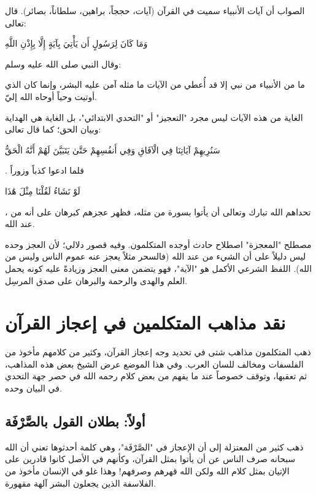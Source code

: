 الصواب أن آيات الأنبياء سميت في القرآن (آيات، حججاً، براهين، سلطاناً، بصائر). قال تعالى:
\begin{ayah}
وَمَا كَانَ لِرَسُولٍ أَن يَأْتِيَ بِآيَةٍ إِلَّا بِإِذْنِ اللَّهِ
\end{ayah}
وقال النبي صلى الله عليه وسلم:
\begin{hadith}
ما من الأنبياء من نبي إلا قد أُعطي من الآيات ما مثله آمن عليه البشر، وإنما كان الذي أوتيت وحياً أوحاه الله إليّ.
\end{hadith}

الغاية من هذه الآيات ليس مجرد "التعجيز" أو "التحدي الابتدائي"، بل الغاية هي الهداية وبيان الحق؛ كما قال تعالى: \begin{ayah}سَنُرِيهِمْ آيَاتِنَا فِي الْآفَاقِ وَفِي أَنفُسِهِمْ حَتَّىٰ يَتَبَيَّنَ لَهُمْ أَنَّهُ الْحَقُّ\end{ayah}. فلما ادعوا كذباً وزوراً \begin{ayah}لَوْ نَشَاءُ لَقُلْنَا مِثْلَ هَٰذَا\end{ayah}، تحداهم الله تبارك وتعالى أن يأتوا بسورة من مثله، فظهر عجزهم كبرهان على أنه من عند الله.

\begin{fawaid}
مصطلح "المعجزة" اصطلاح حادث أوجده المتكلمون. وفيه قصور دلالي؛ لأن العجز وحده ليس دليلاً على أن الشيء من عند الله (فالسحر مثلاً يعجز عنه عموم الناس وليس من الله). اللفظ الشرعي الأكمل هو "الآية"، فهو يتضمن معنى العجز وزيادةً عليه كونه يحمل العلم والهدى والرحمة والبرهان على صدق المرسِل.
\end{fawaid}

\separator

\section{نقد مذاهب المتكلمين في إعجاز القرآن}
ذهب المتكلمون مذاهب شتى في تحديد وجه إعجاز القرآن، وكثير من كلامهم مأخوذ من الفلسفات ومخالف للسان العرب. وفي هذا الموضع عرض الشيخ بعض هذه المذاهب، ثم تعقبها، وتوقف خصوصاً عند ما يفهم من بعض كلام  رحمه الله في حصر جهة التحدي في البيان وحده.

\subsection{أولاً: بطلان القول بالصَّرْفَة}
ذهب كثير من المعتزلة إلى أن الإعجاز في "الصَّرْفَة"، وهي كلمة أحدثوها تعني أن الله سبحانه صرف الناس عن أن يأتوا بمثل القرآن، وكأنهم في الأصل كانوا قادرين على الإتيان بمثل كلام الله ولكن الله قهرهم وصرفهم! وهذا غلو في الإنسان مأخوذ من الفلاسفة الذين يجعلون البشر آلهة مقهورة.

